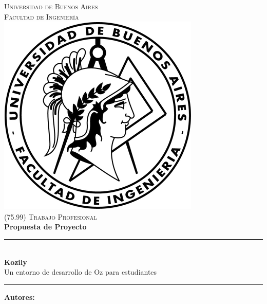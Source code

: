 \documentclass[a4paper,11pt]{article}
\begin{document}

\thispagestyle{empty}

\begin{titlepage}

  \newcommand{\HRule}{\rule{\linewidth}{0.5mm}}
  \newenvironment{bottompar}{\par\vspace*{\fill}}{\clearpage}

  \center

  \textsc{\LARGE Universidad de Buenos Aires}\\[0.5cm]
  \textsc{\Large Facultad de Ingeniería}\\[1.5cm]

  \includegraphics[scale=0.5]{assets/logo.png}\\[1cm]


  \textsc{\large (75.99) Trabajo Profesional}\\[0.25cm]
  {\huge \bfseries Propuesta de Proyecto} \\[0.4cm]
  \HRule \\[0.4cm]
  {\huge \bfseries Kozily} \\[0.4cm]
  Un entorno de desarrollo de Oz para estudiantes
  \HRule

  \begin{bottompar}
    \begin{minipage}[t]{.45\linewidth}
      \begin{flushleft}
        {\bfseries Autores:}


\end{flushleft}
\end{minipage}
\end{bottompar}
\end{titlepage}
\end{document}
